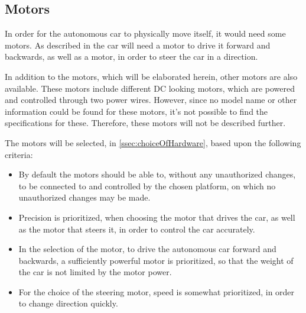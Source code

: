 \subsection{Motors}\label{ssec:motors}
In order for the autonomous car to physically move itself, it would need some motors.
As described in  the car will need a motor to drive it forward and backwards, as well as a motor, in order to steer the car in a direction.

In addition to the motors, which will be elaborated herein, other motors are also available.
These motors include different DC looking motors, which are powered and controlled through two power wires.
However, since no model name or other information could be found for these motors, it's not possible to find the specifications for these.
Therefore, these motors will not be described further.

The motors will be selected, in \autoref{ssec:choiceOfHardware}, based upon the following criteria:
\begin{itemize}
  \item By default the motors should be able to, without any unauthorized changes, to be connected to and controlled by the chosen platform, on which no unauthorized changes may be made.
  \item Precision is prioritized, when choosing the motor that drives the car, as well as the motor that steers it, in order to control the car accurately.
  \item In the selection of the motor, to drive the autonomous car forward and backwards, a sufficiently powerful motor is prioritized, so that the weight of the car is not limited by the motor power.
  \item For the choice of the steering motor, speed is somewhat prioritized, in order to change direction quickly.
\end{itemize}
